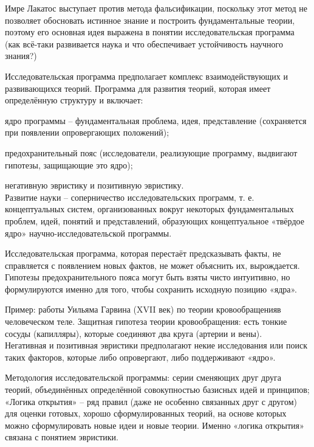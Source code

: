 \documentclass[exam_answers.tex]{subfiles}
\begin{document}
\renewcommand{\baselinestretch}{0.75}

Имре Лакатос выступает против метода фальсификации, поскольку этот метод не позволяет обосновать истинное знание и построить фундаментальные теории, поэтому его основная идея выражена в понятии исследовательская программа (как всё-таки развивается наука и что обеспечивает устойчивость научного знания?)

Исследовательская программа предполагает комплекс взаимодействующих и развивающихся теорий. Программа для развития теорий, которая имеет определённую структуру и включает:

ядро программы – фундаментальная проблема, идея, представление (сохраняется при появлении опровергающих положений);

предохранительный пояс (исследователи, реализующие программу, выдвигают гипотезы, защищающие это ядро);

негативную эвристику и позитивную эвристику.
\\

Развитие науки – соперничество исследовательских программ, т. е. концептуальных систем, организованных вокруг некоторых фундаментальных проблем, идей, понятий и представлений, образующих концептуальное «твёрдое ядро» научно-исследовательской программы.

Исследовательская программа, которая перестаёт предсказывать факты, не справляется с появлением новых фактов, не может объяснить их, вырождается.
\\

Гипотезы предохранительного пояса могут быть взяты чисто интуитивно, но формулируются именно для того, чтобы сохранить исходную позицию «ядра».

Пример: работы Уильяма Гарвина (XVII век) по теории кровообращенияв человеческом теле. Защитная гипотеза теории кровообращения: есть тонкие сосуды (капилляры), которые соединяют два круга (артерии и вены).
\\

Негативная и позитивная эвристики предполагают некие исследования или поиск таких факторов, которые либо опровергают, либо поддерживают «ядро».

Методология исследовательской программы: серии сменяющих друг друга теорий, объединённых определённой совокупностью базисных идей и принципов; «Логика открытия» -- ряд правил (даже не особенно связанных друг с другом) для оценки готовых, хорошо сформулированных теорий, на основе которых можно сформулировать новые идеи и новые теории. Именно «логика открытия» связана с понятием эвристики.
\\
\end{document}
